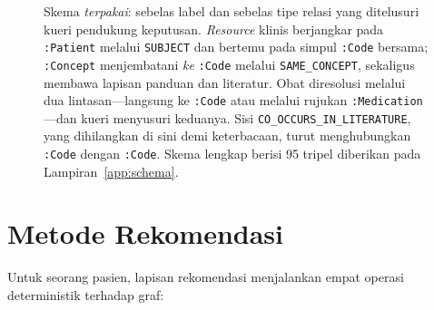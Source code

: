 \begin{figure}[htbp]
{}
\caption{Skema \emph{terpakai}: sebelas label dan sebelas tipe relasi yang ditelusuri kueri pendukung
keputusan. \emph{Resource} klinis berjangkar pada \texttt{:Patient} melalui \texttt{SUBJECT}
dan bertemu pada simpul \texttt{:Code} bersama; \texttt{:Concept} menjembatani \emph{ke}
\texttt{:Code} melalui \texttt{SAME\_CONCEPT}, sekaligus membawa lapisan panduan dan
literatur. Obat diresolusi melalui dua lintasan---langsung ke \texttt{:Code} atau melalui
rujukan \texttt{:Medication}---dan kueri menyusuri keduanya. Sisi
\texttt{CO\_OCCURS\_IN\_LITERATURE}, yang dihilangkan di sini demi keterbacaan, turut
menghubungkan \texttt{:Code} dengan \texttt{:Code}. Skema lengkap berisi 95 tripel diberikan
pada Lampiran~\ref{app:schema}.}
\label{fig:graph-model}
\end{figure}

\section{Metode Rekomendasi}
\label{sec:dss-method}

Untuk seorang pasien, lapisan rekomendasi menjalankan empat operasi deterministik
terhadap graf:

